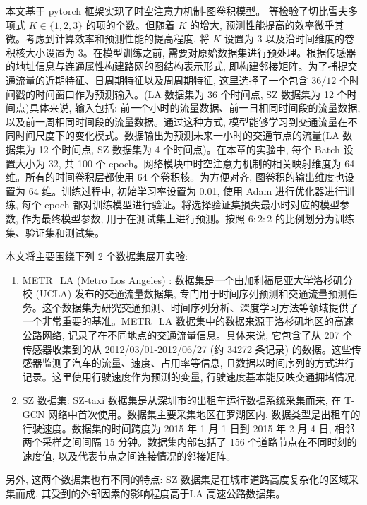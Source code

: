 本文基于 pytorch 框架实现了时空注意力机制-图卷积模型。\textcite{2016_Kipf_Semi_supervised_classification_with_graph_convolutionalnetworks} 等检验了切比雪夫多项式 \({K} \in  \{ 1, 2, 3\}\) 的项的个数。但随着 \({K}\) 的增大, 预测性能提高的效率微乎其微。考虑到计算效率和预测性能的提高程度, 将 \({K}\) 设置为 3 以及沿时间维度的卷积核大小设置为 3。在模型训练之前, 需要对原始数据集进行预处理。根据传感器的地址信息与连通属性构建路网的图结构表示形式, 即构建邻接矩阵。为了捕捉交通流量的近期特征、日周期特征以及周周期特征, 这里选择了一个包含 \({36}/{12}\) 个时间戳的时间窗口作为预测输入。(LA 数据集为 36 个时间点, SZ 数据集为 12 个时间点)具体来说, 输入包括: 前一个小时的流量数据、前一日相同时间段的流量数据, 以及前一周相同时间段的流量数据。通过这种方式, 模型能够学习到交通流量在不同时间尺度下的变化模式。数据输出为预测未来一小时的交通节点的流量(LA 数据集为 12 个时间点, SZ 数据集为 4 个时间点)。在本章的实验中, 每个 Batch 设置大小为 32, 共 100 个 epoch。网络模块中时空注意力机制的相关映射维度为 64 维。所有的时间卷积层都使用 64 个卷积核。为方便对齐, 图卷积的输出维度也设置为 64 维。训练过程中, 初始学习率设置为 0.01, 使用 Adam 进行优化器进行训练, 每个 epoch 都对训练模型进行验证。将选择验证集损失最小时对应的模型参数, 作为最终模型参数, 用于在测试集上进行预测。按照 $6:2:2$ 的比例划分为训练集、验证集和测试集。

本文将主要围绕下列 2 个数据集展开实验:

\begin{enumerate}[(1)]
  \item METR\_LA (Metro Los Angeles) : 数据集是一个由加利福尼亚大学洛杉矶分校 (UCLA) 发布的交通流量数据集, 专门用于时间序列预测和交通流量预测任务。这个数据集为研究交通预测、时间序列分析、深度学习方法等领域提供了一个非常重要的基准。METR\_LA 数据集中的数据来源于洛杉矶地区的高速公路网络, 记录了在不同地点的交通流量信息。具体来说, 它包含了从 207 个传感器收集到的从 2012/03/01-2012/06/27 (约 34272 条记录) 的数据。这些传感器监测了汽车的流量、速度、占用率等信息, 且数据以时间序列的方式进行记录。这里使用行驶速度作为预测的变量, 行驶速度基本能反映交通拥堵情况.

  \item SZ 数据集: SZ-taxi 数据集是从深圳市的出租车运行数据系统采集而来, 在 T-GCN 网络中首次使用。数据集主要采集地区在罗湖区内, 数据类型是出租车的行驶速度。数据集的时间跨度为 2015 年 1 月 1 日到 2015 年 2 月 4 日, 相邻两个采样之间间隔 15 分钟。数据集内部包括了 156 个道路节点在不同时刻的速度值, 以及代表节点之间连接情况的邻接矩阵。
\end{enumerate}

另外, 这两个数据集也有不同的特点: SZ 数据集是在城市道路高度复杂化的区域采集而成, 其受到的外部因素的影响程度高于LA 高速公路数据集。


